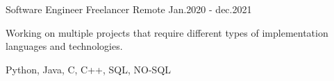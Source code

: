 

\begin{cventries}

  \cventry
    {Software Engineer} %
    {Freelancer} %
    {Remote} %
    {Jan.2020 - dec.2021} %
    {
      \begin{cvitems} %
        \item {Working on multiple projects that require different types of implementation languages and technologies.}
        \item {Python, Java, C, C++, SQL, NO-SQL}
      \end{cvitems}
    }

\end{cventries}
